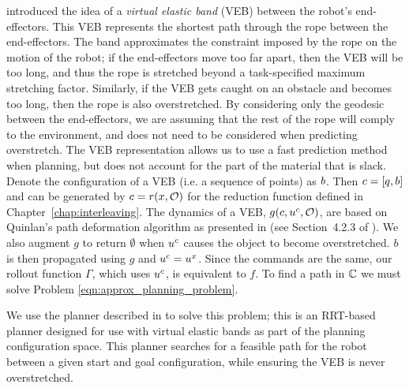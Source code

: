 \cite{McConachie2017} introduced the idea of a \textit{virtual elastic band} (VEB) between the robot's end-effectors. This VEB represents the shortest path through the rope between the end-effectors. The band approximates the constraint imposed by the rope on the motion of the robot; if the end-effectors move too far apart, then the VEB will be too long, and thus the rope is stretched beyond a task-specified maximum stretching factor. Similarly, if the VEB gets caught on an obstacle and becomes too long, then the rope is also overstretched. By considering only the geodesic between the end-effectors, we are assuming that the rest of the rope will comply to the environment, and does not need to be considered when predicting overstretch. The VEB representation allows us to use a fast prediction method when planning, but does not account for the part of the material that is slack. Denote the configuration of a VEB (i.e. a sequence of points) as $b$. Then $c = [q,b]$ and can be generated by $c = r(x,\mathcal{O})$ for the reduction function defined in Chapter~\ref{chap:interleaving}. The dynamics of a VEB, $g(c,u^c,\mathcal{O})$, are based on Quinlan's path deformation algorithm as presented in \cite{Quinlan1994} (see Section~4.2.3 of \cite{McConachie2017}). We also augment $g$ to return $\emptyset$ when $u^c$ causes the object to become overstretched. %
$b$ is then propagated using $g$ and $u^c = u^x$. Since the commands are the same, our rollout function $\Gamma$, which uses $u^c$, is equivalent to $f$. To find a path in $\mathbb{C}$ we must solve Problem \eqref{eqn:approx_planning_problem}.


We use the planner described in \cite{McConachie2020} to solve this problem; this is an RRT-based planner designed for use with virtual elastic bands as part of the planning configuration space. This planner searches for a feasible path for the robot between a given start and goal configuration, while ensuring the VEB is never overstretched.

